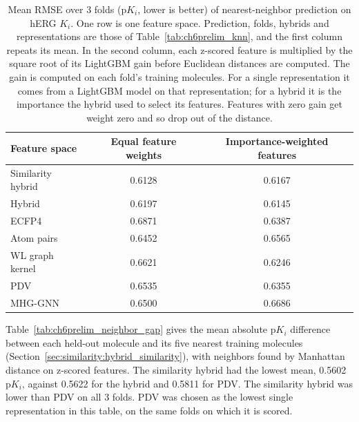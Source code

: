 \begin{table}[htbp]
\centering
\small
\begin{tabular}{@{}lcc@{}}
\toprule
Feature space & Equal feature weights & Importance-weighted features \\
\midrule
Similarity hybrid & 0.6128 & 0.6167 \\
Hybrid & 0.6197 & 0.6145 \\
ECFP4 & 0.6871 & 0.6387 \\
Atom pairs & 0.6452 & 0.6565 \\
WL graph kernel & 0.6621 & 0.6246 \\
PDV & 0.6535 & 0.6355 \\
MHG-GNN & 0.6500 & 0.6686 \\
\bottomrule
\end{tabular}
\caption[Nearest-neighbor prediction on hERG $K_i$ with importance weighting]{Mean RMSE over 3 folds (p$K_i$, lower is better) of nearest-neighbor prediction on hERG $K_i$. One row is one feature space. Prediction, folds, hybrids and representations are those of Table~\ref{tab:ch6prelim_knn}, and the first column repeats its mean. In the second column, each z-scored feature is multiplied by the square root of its LightGBM gain before Euclidean distances are computed. The gain is computed on each fold's training molecules. For a single representation it comes from a LightGBM model on that representation; for a hybrid it is the importance the hybrid used to select its features. Features with zero gain get weight zero and so drop out of the distance.}
\label{tab:ch6prelim_knn_weighted}
\end{table}

Table~\ref{tab:ch6prelim_neighbor_gap} gives the mean absolute p$K_i$ difference between each held-out molecule and its five nearest training molecules (Section~\ref{sec:similarity:hybrid_similarity}), with neighbors found by Manhattan distance on z-scored features. The similarity hybrid had the lowest mean, 0.5602 p$K_i$, against 0.5622 for the hybrid and 0.5811 for PDV. The similarity hybrid was lower than PDV on all 3 folds. PDV was chosen as the lowest single representation in this table, on the same folds on which it is scored.

